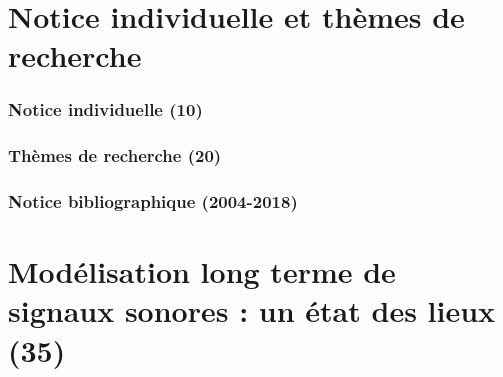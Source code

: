 \documentclass[a4paper, french, 10pt]{book}
\title{}
\author{Mathieu Lagrange}
\begin{document}

\part{Notice individuelle et thèmes de recherche}

\section{Notice individuelle (10)}



\section{Thèmes de recherche (20)}



\section{Notice bibliographique (2004-2018)}



\part{Modélisation long terme de signaux sonores : un état des lieux (35)}


\end{document}
